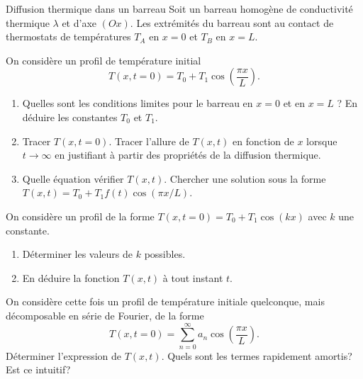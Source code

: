 \begin{exo}[PC][1][colle]{Diffusion thermique dans un barreau}
Soit un barreau homogène de conductivité thermique $\lambda$ et d'axe $(Ox)$. Les extrémités du barreau sont au contact de thermostats de températures $T_A$ en $x=0$ et $T_B$ en $x=L$.

\begin{quest}
  \item
On considère un profil de température initial 
  $$T(x, t=0)=T_0+T_1 \cos \left(\frac{\pi x}{L}\right).$$
  \begin{enumerate}
    \item	Quelles sont les conditions limites pour le barreau en $x=0$ et en $x=L$ ? En déduire les constantes $T_0$ et $T_1$.
    \item Tracer $T(x, t=0)$. Tracer l'allure de $T(x, t)$ en fonction de $x$ lorsque $t \rightarrow \infty$ en justifiant à partir des propriétés de la diffusion thermique.
    \item Quelle équation vérifier $T(x,t)$. Chercher une solution sous la forme $T(x, t)=T_0+T_1 f(t) \cos (\pi x/L)$.
  \end{enumerate}
  \item On considère un profil de la forme $T(x, t=0)=T_0+T_1 \cos (k x)$ avec $k$ une constante.
 \begin{enumerate}
    \item 
     Déterminer les valeurs de $k$ possibles.
     \item  En déduire la fonction $T(x, t)$ à tout instant $t$.
  \end{enumerate}
  \item On considère cette fois un profil de température initiale quelconque, mais décomposable en série de Fourier, de la forme 
  $$T(x, t=0)=\sum_{n=0}^\infty a_n \cos \left(\frac{\pi x}{L}\right).$$ Déterminer l'expression de $T(x, t)$. Quels sont les termes rapidement amortis? Est ce intuitif?
\end{quest}
\end{exo}


